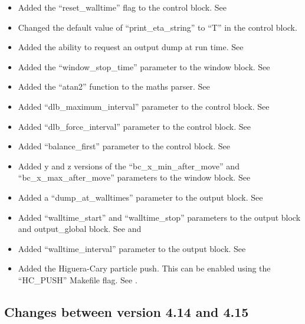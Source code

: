 \begin{itemize}
\item Added the ``reset\_walltime'' flag to the control block.
    See 
\item Changed the default value of ``print\_eta\_string'' to ``T'' in the
    control block.
\item Added the ability to request an output dump at run time.
    See 
\item Added the ``window\_stop\_time'' parameter to the window block.
    See 
\item Added the ``atan2'' function to the maths parser.
    See 
\item Added ``dlb\_maximum\_interval'' parameter to the control block.
    See 
\item Added ``dlb\_force\_interval'' parameter to the control block.
    See 
\item Added ``balance\_first'' parameter to the control block.
    See 
\item Added y and z versions of the ``bc\_x\_min\_after\_move'' and
    ``bc\_x\_max\_after\_move'' parameters to the window block.
    See 
\item Added a ``dump\_at\_walltimes'' parameter to the output block.
    See 
\item Added ``walltime\_start'' and ``walltime\_stop'' parameters to the output
    block and output\_global block.
    See  and 
\item Added ``walltime\_interval'' parameter to the output block.
    See 
\item Added the Higuera-Cary particle push. This can be enabled using the
    ``HC\_PUSH'' Makefile flag. See .
\end{itemize}
\bigskip


\subsection{Changes between version 4.14 and 4.15}

